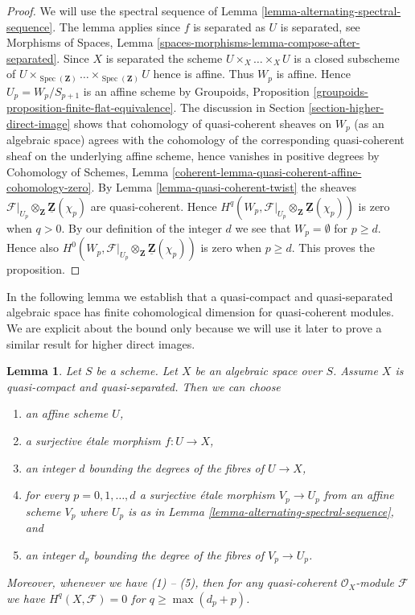 \documentclass{stacks-project}
\theoremstyle{plain}
\newtheorem{lemma}[subsection]{Lemma}
\theoremstyle{definition}
\theoremstyle{remark}
\numberwithin{equation}{subsection}
\def\Spec{\mathop{\mathrm{Spec}}}
\begin{document}
\begin{proof}
We will use the spectral sequence of
Lemma \ref{lemma-alternating-spectral-sequence}.
The lemma applies since $f$ is separated as $U$ is separated, see
Morphisms of Spaces, Lemma
\ref{spaces-morphisms-lemma-compose-after-separated}.
Since $X$ is separated the scheme $U \times_X \ldots \times_X U$ is a closed
subscheme of
$U \times_{\Spec(\mathbf{Z})} \ldots \times_{\Spec(\mathbf{Z})} U$
hence is affine. Thus $W_p$ is affine. Hence $U_p = W_p/S_{p + 1}$ is an
affine scheme by
Groupoids, Proposition \ref{groupoids-proposition-finite-flat-equivalence}.
The discussion in
Section \ref{section-higher-direct-image}
shows that cohomology of quasi-coherent sheaves on $W_p$ (as an algebraic
space) agrees with the cohomology of the corresponding quasi-coherent
sheaf on the underlying affine scheme, hence vanishes in positive degrees by
Cohomology of Schemes, Lemma
\ref{coherent-lemma-quasi-coherent-affine-cohomology-zero}.
By
Lemma \ref{lemma-quasi-coherent-twist}
the sheaves
$\mathcal{F}|_{U_p} \otimes_\mathbf{Z} \underline{\mathbf{Z}}(\chi_p)$
are quasi-coherent. Hence
$H^q(W_p,
\mathcal{F}|_{U_p} \otimes_\mathbf{Z} \underline{\mathbf{Z}}(\chi_p))$
is zero when $q > 0$. By our definition of the integer $d$ we see that
$W_p = \emptyset$ for $p \geq d$. Hence also
$H^0(W_p,
\mathcal{F}|_{U_p} \otimes_\mathbf{Z} \underline{\mathbf{Z}}(\chi_p))$
is zero when $p \geq d$.
This proves the proposition.
\end{proof}

\noindent
In the following lemma we establish that a quasi-compact and
quasi-separated algebraic space has finite cohomological dimension
for quasi-coherent modules. We are explicit about the bound only because
we will use it later to prove a similar result for higher direct
images.

\begin{lemma}
\label{lemma-vanishing-quasi-separated}
Let $S$ be a scheme. Let $X$ be an algebraic space over $S$.
Assume $X$ is quasi-compact and quasi-separated.
Then we can choose
\begin{enumerate}
\item an affine scheme $U$,
\item a surjective \'etale morphism $f : U \to X$,
\item an integer $d$ bounding the degrees of the fibres of $U \to X$,
\item for every $p = 0, 1, \ldots, d$ a surjective \'etale morphism
$V_p \to U_p$ from an affine scheme $V_p$ where $U_p$ is as in
Lemma \ref{lemma-alternating-spectral-sequence}, and
\item an integer $d_p$ bounding the degree of the fibres of $V_p \to U_p$.
\end{enumerate}
Moreover, whenever we have (1) -- (5), then for any quasi-coherent
$\mathcal{O}_X$-module $\mathcal{F}$ we have $H^q(X, \mathcal{F}) = 0$ for
$q \geq \max(d_p + p)$.
\end{lemma}
\end{document}
